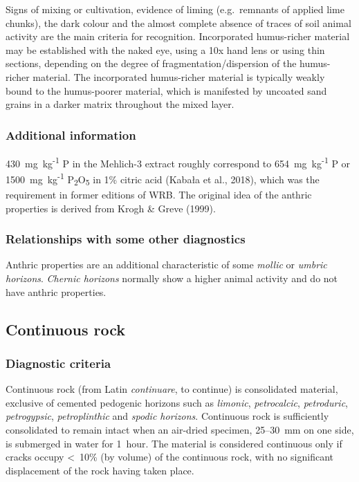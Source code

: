 \documentclass[
  letterpaper,
  DIV=11,
  numbers=noendperiod]{scrreprt}
\begin{document}
Signs of mixing or cultivation, evidence of liming (e.g.~remnants of
applied lime chunks), the dark colour and the almost complete absence of
traces of soil animal activity are the main criteria for recognition.
Incorporated humus-richer material may be established with the naked
eye, using a 10x hand lens or using thin sections, depending on the
degree of fragmentation/dispersion of the humus-richer material. The
incorporated humus-richer material is typically weakly bound to the
humus-poorer material, which is manifested by uncoated sand grains in a
darker matrix throughout the mixed layer.

\hypertarget{additional-information-24}{%
\subsubsection{Additional information}\label{additional-information-24}}

430~mg~kg\textsuperscript{-1} P in the Mehlich-3 extract roughly
correspond to 654~mg~kg\textsuperscript{-1} P or
1500~mg~kg\textsuperscript{-1} P\textsubscript{2}O\textsubscript{5} in
1\% citric acid (Kabała et al., 2018), which was the requirement in
former editions of WRB. The original idea of the anthric properties is
derived from Krogh \& Greve (1999).

\hypertarget{relationships-with-some-other-diagnostics-41}{%
\subsubsection{Relationships with some other
diagnostics}\label{relationships-with-some-other-diagnostics-41}}

Anthric properties are an additional characteristic of some
\emph{mollic} or \emph{umbric horizons}. \emph{Chernic horizons}
normally show a higher animal activity and do not have anthric
properties.

\hypertarget{continuous-rock}{%
\subsection{Continuous rock}\label{continuous-rock}}

\hypertarget{diagnostic-criteria-44}{%
\subsubsection{Diagnostic criteria}\label{diagnostic-criteria-44}}

Continuous rock (from Latin \emph{continuare}, to continue) is
consolidated material, exclusive of cemented pedogenic horizons such as
\emph{limonic}, \emph{petrocalcic}, \emph{petroduric},
\emph{petrogypsic}, \emph{petroplinthic} and \emph{spodic horizons}.
Continuous rock is sufficiently consolidated to remain intact when an
air-dried specimen, 25--30~mm on one side, is submerged in water for
1~hour. The material is considered continuous only if cracks occupy
\textless~10\% (by volume) of the continuous rock, with no significant
displacement of the rock having taken place.
\end{document}
